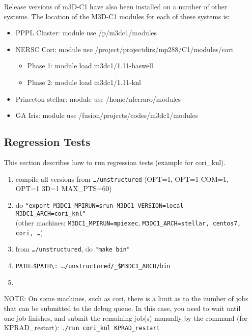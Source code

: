 Release versions of m3D-C1 have also been installed on a number of other systems.   The location of the M3D-C1 modules for each of these systems is:
\begin{itemize}
\item	PPPL Cluster:	module use /p/m3dc1/modules
\item	NERSC Cori:	module use /project/projectdirs/mp288/C1/modules/cori
\begin{itemize}
\item		Phase 1: module load m3dc1/1.11-haswell
\item		Phase 2: module load m3dc1/1.11-knl
\end{itemize}
\item	Princeton stellar:	module use /home/nferraro/modules
\item	GA Iris:		module use /fusion/projects/codes/m3dc1/modules
\end{itemize}

\subsection{Regression Tests}
This section describes how to run regression tests (example for cori\_knl).

\begin{enumerate}
\item compile all versions from \texttt{\ldots/unstructured} (OPT=1, OPT=1 COM=1, OPT=1 3D=1 MAX\_PTS=60)
\item do \texttt{"export M3DC1\_MPIRUN=srun M3DC1\_VERSION=local M3DC1\_ARCH=cori\_knl"}
\\
(other machines: \texttt{M3DC1\_MPIRUN=mpiexec}, \texttt{M3DC1\_ARCH=stellar, centos7, cori, \ldots})
\item from \texttt{\ldots/unstructured}, do \texttt{"make bin"}
\item \texttt{PATH=\$PATH\textbackslash: \ldots/unstructured/\_\$M3DC1\_ARCH/bin}
\item 
{}
\end{enumerate}

NOTE:  On some machines, such as cori, there is a limit as to the number of jobs that can be submitted to the debug queue.   In this case, you need to wait until one job finishes, and submit the remaining job(s) manually by the command (for KPRAD\_restart):
\texttt{./run cori\_knl KPRAD\_restart}

